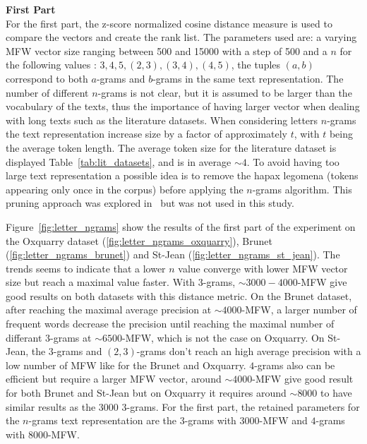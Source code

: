\textbf{First Part}\\
For the first part, the z-score normalized cosine distance measure is used to compare the vectors and create the rank list.
The parameters used are: a varying MFW vector size ranging between 500 and 15000 with a step of 500 and a $n$ for the following values : $3, 4, 5, (2, 3), (3, 4), (4, 5)$, the tuples $(a, b)$ correspond to both $a$-grams and $b$-grams in the same text representation.
The number of different $n$-grams is not clear, but it is assumed to be larger than the vocabulary of the texts, thus the importance of having larger vector when dealing with long texts such as the literature datasets.
When considering letters $n$-grams the text representation increase size by a factor of approximately $t$, with $t$ being the average token length.
The average token size for the literature dataset is displayed Table~\ref{tab:lit_datasets}, and is in average $\sim 4$.
To avoid having too large text representation a possible idea is to remove the hapax legomena (tokens appearing only once in the corpus) before applying the $n$-grams algorithm.
This pruning approach was explored in~\cite{kocher_linking} but was not used in this study.

Figure~\ref{fig:letter_ngrams} show the results of the first part of the experiment on the Oxquarry dataset (\ref{fig:letter_ngrams_oxquarry}), Brunet (\ref{fig:letter_ngrams_brunet}) and St-Jean (\ref{fig:letter_ngrams_st_jean}).
The trends seems to indicate that a lower $n$ value converge with lower MFW vector size but reach a maximal value faster.
With $3$-grams, $\sim 3000-4000$-MFW give good results on both datasets with this distance metric.
On the Brunet dataset, after reaching the maximal average precision at $\sim 4000$-MFW, a larger number of frequent words decrease the precision until reaching the maximal number of differant $3$-grams at $\sim 6500$-MFW, which is not the case on Oxquarry.
On St-Jean, the $3$-grams and $(2,3)$-grams don't reach an high average precision with a low number of MFW like for the Brunet and Oxquarry.
$4$-grams also can be efficient but require a larger MFW vector, around $\sim 4000$-MFW give good result for both Brunet and St-Jean but on Oxquarry it requires around $\sim 8000$ to have similar results as the $3000$ $3$-grams.
For the first part, the retained parameters for the $n$-grams text representation are the $3$-grams with $3000$-MFW and $4$-grams with $8000$-MFW.

